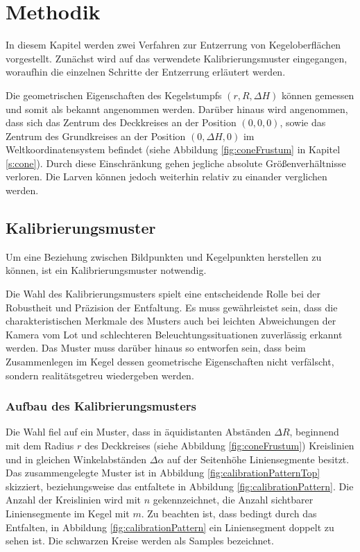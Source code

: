 \chapter{Methodik}
\label{ch:method}
In diesem Kapitel werden zwei Verfahren zur Entzerrung von Kegeloberflächen vorgestellt.
Zunächst wird auf das verwendete Kalibrierungsmuster eingegangen, woraufhin die einzelnen Schritte der Entzerrung erläutert werden.

Die geometrischen Eigenschaften des Kegelstumpfs $(r, R, \Delta H)$ können gemessen und somit als bekannt angenommen werden.
Darüber hinaus wird angenommen, dass sich das Zentrum des Deckkreises an der Position $(0,0,0)$, sowie das Zentrum des Grundkreises an der Position $(0,\Delta H, 0)$ im Weltkoordinatensystem befindet (siehe Abbildung \ref{fig:coneFrustum} in Kapitel \ref{s:cone}). Durch diese Einschränkung gehen jegliche absolute Größenverhältnisse verloren. Die Larven können jedoch weiterhin relativ zu einander verglichen werden.


\section{Kalibrierungsmuster}
\label{s:calibrationPattern}
Um eine Beziehung zwischen Bildpunkten und Kegelpunkten herstellen zu können, ist ein Kalibrierungsmuster notwendig.

Die Wahl des Kalibrierungsmusters spielt eine entscheidende Rolle bei der Robustheit und Präzision der Entfaltung. Es muss gewährleistet sein, dass die charakteristischen Merkmale des Musters auch bei leichten Abweichungen der Kamera vom Lot und schlechteren Beleuchtungssituationen zuverlässig erkannt werden. Das Muster muss darüber hinaus so entworfen sein, dass beim Zusammenlegen im Kegel dessen geometrische Eigenschaften nicht verfälscht, sondern realitätsgetreu wiedergeben werden.

\subsection{Aufbau des Kalibrierungsmusters}
Die Wahl fiel auf ein Muster, dass in äquidistanten Abständen $\Delta R$, beginnend mit dem Radius $r$ des Deckkreises (siehe Abbildung \ref{fig:coneFrustum}) Kreislinien und in gleichen Winkelabständen $\Delta \alpha$ auf der Seitenhöhe Liniensegmente besitzt. Das zusammengelegte Muster ist in Abbildung \ref{fig:calibrationPatternTop} skizziert, beziehungsweise das entfaltete in Abbildung \ref{fig:calibrationPattern}. Die Anzahl der Kreislinien wird mit $n$ gekennzeichnet, die Anzahl sichtbarer Liniensegmente im Kegel mit $m$. Zu beachten ist, dass bedingt durch das Entfalten, in Abbildung \ref{fig:calibrationPattern}  ein Liniensegment doppelt zu sehen ist. Die schwarzen Kreise werden als Samples bezeichnet.

